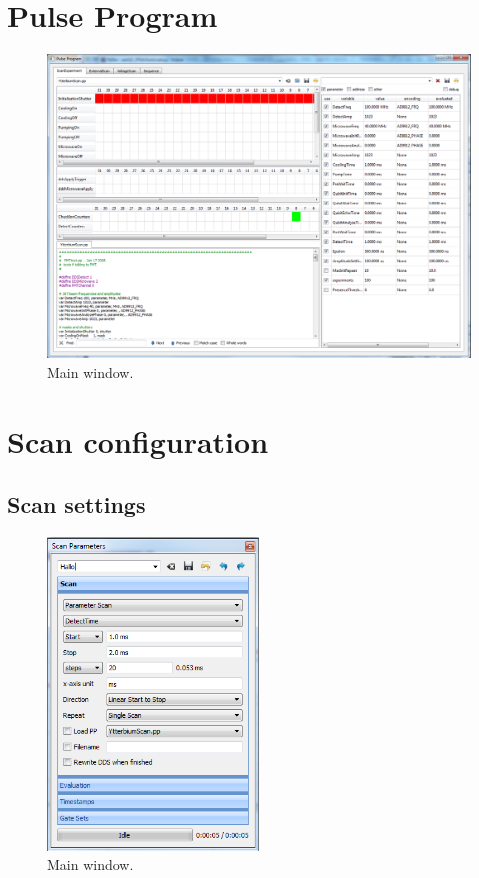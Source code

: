 \documentclass[11pt]{scrartcl}
\begin{document}
\section{Pulse Program}
\begin{figure}[htbp]
\begin{center}
\includegraphics[width=\textwidth]{PulseProgram}
\end{center}
\caption{\label{PulseProgram} Main window.}
\end{figure}

\section{Scan configuration}
\subsection{Scan settings}
\begin{figure}[htbp]
\begin{center}
\includegraphics[width=0.5\textwidth]{ScanParametersScan}
\end{center}
\caption{\label{PulseProgram} Main window.}
\end{figure}
\end{document}
